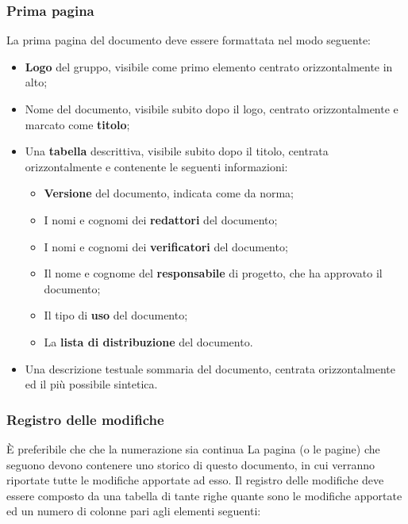 	\subsubsection{Prima pagina}
	
	La prima pagina del documento deve essere formattata nel modo seguente:
	
	\begin{itemize}
	
		\item \textbf{Logo} del gruppo, visibile come primo elemento centrato orizzontalmente in alto;
		\item Nome del documento, visibile subito dopo il logo, centrato orizzontalmente e marcato come \textbf{titolo};
		\item Una \textbf{tabella} descrittiva, visibile subito dopo il titolo, centrata orizzontalmente e contenente le seguenti informazioni:
			\begin{itemize}
			
				\item \textbf{Versione} del documento, indicata come da norma;
				\item I nomi e cognomi dei \textbf{redattori} del documento;
				\item I nomi e cognomi dei \textbf{verificatori} del documento;
				\item Il nome e cognome del \textbf{responsabile} di progetto, che ha approvato il documento;
				\item Il tipo di \textbf{uso} del documento;
				\item La \textbf{lista di distribuzione} del documento.
			
			\end{itemize}
		\item Una descrizione testuale sommaria del documento, centrata orizzontalmente ed il più possibile sintetica.
	
	\end{itemize}
	
	\subsubsection{Registro delle modifiche}
È preferibile che che la numerazione sia continua	
	La pagina (o le pagine) che seguono devono contenere uno storico di questo documento, in cui verranno riportate tutte le modifiche apportate ad esso. Il registro delle modifiche deve essere composto da una tabella di tante righe quante sono le modifiche apportate ed un numero di colonne pari agli elementi seguenti:
	
